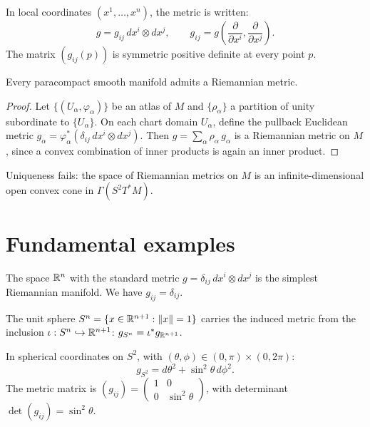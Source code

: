 In local coordinates $(x^1, \ldots, x^n)$, the metric is written:
\[
    g = g_{ij} \, dx^i \otimes dx^j, \qquad
    g_{ij} = g\!\left(\frac{\partial}{\partial x^i}, \frac{\partial}{\partial x^j}\right).
\]
The matrix $(g_{ij}(p))$ is symmetric positive definite at every point $p$.

\begin{theorem}
Every paracompact smooth manifold admits a Riemannian metric.
\end{theorem}

\begin{proof}
Let $\{(U_\alpha, \varphi_\alpha)\}$ be an atlas of $M$ and $\{\rho_\alpha\}$ a
partition of unity subordinate to $\{U_\alpha\}$. On each chart domain $U_\alpha$,
define the pullback Euclidean metric
$g_\alpha = \varphi_\alpha^*(\delta_{ij}\, dx^i \otimes dx^j)$.
Then $g = \sum_\alpha \rho_\alpha \, g_\alpha$ is a Riemannian metric on $M$,
since a convex combination of inner products is again an inner product.
\end{proof}

\begin{remark}
Uniqueness fails: the space of Riemannian metrics on $M$ is an infinite-dimensional
open convex cone in $\Gamma(S^2 T^*M)$.
\end{remark}

\section{Fundamental examples}

\begin{example}
The space $\mathbb{R}^n$ with the standard metric $g = \delta_{ij}\, dx^i \otimes dx^j$
is the simplest Riemannian manifold. We have $g_{ij} = \delta_{ij}$.
\end{example}

\begin{example}
\label{ex:sphere}
The unit sphere $S^n = \{x \in \mathbb{R}^{n+1} : \left\| x \right\| = 1\}$ carries the induced
metric from the inclusion $\iota : S^n \hookrightarrow \mathbb{R}^{n+1}$:
$g_{S^n} = \iota^* g_{\mathbb{R}^{n+1}}$.

In spherical coordinates on $S^2$, with $(\theta, \phi) \in (0,\pi) \times (0,2\pi)$:
\[
    g_{S^2} = d\theta^2 + \sin^2\!\theta \, d\phi^2.
\]
The metric matrix is
$\displaystyle (g_{ij}) = \begin{pmatrix} 1 & 0 \\ 0 & \sin^2\!\theta \end{pmatrix}$,
with determinant $\det(g_{ij}) = \sin^2\!\theta$.
\end{example}

